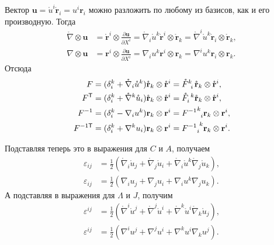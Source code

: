 Вектор $ \mathbf{u} = \mathring{u}^i \mathring{\mathbf{r}}_i = u^i \mathbf{r}_i
$ можно разложить по любому из базисов, как и его производную. Тогда 
\begin{align*}
  \mathring{\nabla}\otimes \mathbf{u} &= \mathring{\mathbf{r}}^i \otimes
  \frac{\partial \mathbf{u}}{\partial X^i} = \mathring{\nabla}_i \mathring{u}^k
  \mathring{\mathbf{r}}^i \otimes \mathring{\mathbf{r}}_k = \mathring{\nabla}^i
  \mathring{u}^k \mathring{\mathbf{r}}_i \otimes \mathring{\mathbf{r}}_k,\\
  {\nabla}\otimes \mathbf{u} &= {\mathbf{r}}^i \otimes
  \frac{\partial \mathbf{u}}{\partial X^i} = {\nabla}_i {u}^k
  {\mathbf{r}}^i \otimes {\mathbf{r}}_k = {\nabla}^i
  {u}^k {\mathbf{r}}_i \otimes \mathbf{r}_k.
\end{align*}
Отсюда 
\begin{align*}
  F &= (\delta^k_i + \mathring{\nabla}_i \mathring{u}^k)\mathring{\mathbf{r}}_k
  \otimes \mathring{\mathbf{r}}^i = \tensor{\mathring{F}}{^k_i}
  \mathring{\mathbf{r}}_k\otimes \mathring{\mathbf{r}}^i,\\
  F^{\mathsf T} &= (\delta^k_i +
  \mathring{\nabla}^k\mathring{u}_i)\mathring{\mathbf{r}}_k\otimes
  \mathring{\mathbf{r}}^i = \tensor{\mathring{F}}{_i^k}\mathring{\mathbf{r}}_k\otimes
  \mathring{\mathbf{r}}^i,\\
  F^{-1} &= (\delta^k_i -
  {\nabla}_i {u}^k) {\mathbf{r}}_k\otimes
  {\mathbf{r}}^i = \tensor{{{F}^{-1}}}{^k_i} {\mathbf{r}}_k\otimes
  {\mathbf{r}}^i,\\
  F^{-1\mathsf T} &= (\delta^k_i +
  {\nabla}^k{u}_i){\mathbf{r}}_k\otimes
  {\mathbf{r}}^i = \tensor{{{F}^{-1}}}{_i^k}{\mathbf{r}}_k\otimes
  {\mathbf{r}}^i.
\end{align*}

Подставляя теперь это в выражения для $ C $ и $ A $, получаем  
\begin{align*}
  \varepsilon_{ij} &= \frac{1}{2}(\mathring{\nabla}_i \mathring{u}_j +
  \mathring{\nabla}_j\mathring{u}_i + \mathring{\nabla}_i\mathring{u}^k
  \mathring{\nabla}_j \mathring{u}_k),\\
  \varepsilon_{ij} &= \frac{1}{2}({\nabla}_i {u}_j +
  {\nabla}_j{u}_i + {\nabla}_i{u}^k
  {\nabla}_j {u}_k).
\end{align*}
А подставляя в выражения для $ \Lambda $ и $ J $, получим
\begin{align*}
  \varepsilon^{ij} &= \frac{1}{2}(\mathring{\nabla}^i \mathring{u}^j +
  \mathring{\nabla}^j\mathring{u}^i + \mathring{\nabla}^k\mathring{u}^i
  \mathring{\nabla}_k \mathring{u}_j),\\
  \varepsilon^{ij} &= \frac{1}{2}({\nabla}^i {u}^j +
  {\nabla}^j{u}^i + {\nabla}^k{u}^i
  {\nabla}_k {u}^j).
\end{align*}

